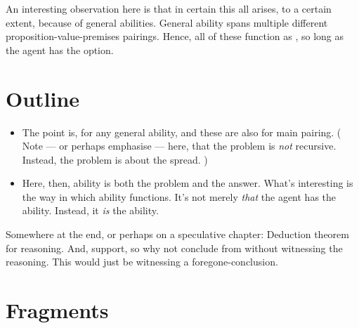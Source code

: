 \begin{note}
  An interesting observation here is that in certain this all arises, to a certain extent, because of general abilities.
  General ability spans multiple different proposition-value-premises pairings.
  Hence, all of these function as , so long as the agent has the option.
\end{note}

\section{Outline}

\begin{note}
  \begin{itemize}
  \item
    The point is,  for any general ability, and these are also  for main pairing.
    (%
    Note --- or perhaps emphasise --- here, that the problem is \emph{not} recursive.
    Instead, the problem is about the spread.%
    )
  \item
    Here, then, ability is both the problem and the answer.
    What's interesting is the way in which ability functions.
    It's not merely \emph{that} the agent has the ability.
    Instead, it \emph{is} the ability.
  \end{itemize}
\end{note}

\begin{note}
  Somewhere at the end, or perhaps on a speculative chapter:
  Deduction theorem for reasoning.
  And, support, so why not conclude from without witnessing the reasoning.
  This would just be witnessing a foregone-conclusion.
\end{note}

\section{Fragments}

